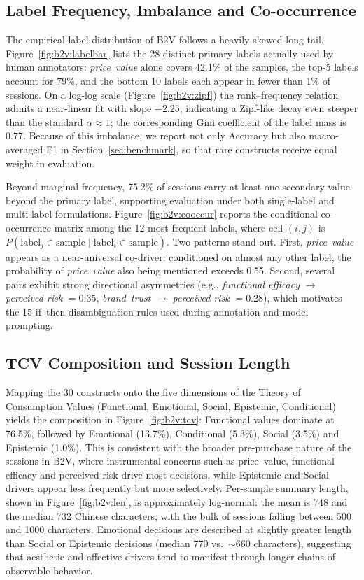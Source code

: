 \documentclass[11pt]{article}
\begin{document}
\subsection{Label Frequency, Imbalance and Co-occurrence}
The empirical label distribution of B2V follows a heavily skewed long tail.
Figure~\ref{fig:b2v:labelbar} lists the 28 distinct primary labels actually
used by human annotators: \emph{price~value} alone covers 42.1\% of the
samples, the top-5 labels account for 79\%, and the bottom 10 labels each
appear in fewer than 1\% of sessions. On a log-log scale
(Figure~\ref{fig:b2v:zipf}) the rank--frequency relation admits a near-linear
fit with slope $-2.25$, indicating a Zipf-like decay even steeper than the
standard $\alpha\!\approx\!1$; the corresponding Gini coefficient of the
label mass is $0.77$. Because of this imbalance, we report not only Accuracy
but also macro-averaged F1 in Section~\ref{sec:benchmark}, so that rare
constructs receive equal weight in evaluation.

Beyond marginal frequency, 75.2\% of sessions carry at least one secondary
value beyond the primary label, supporting evaluation under both single-label
and multi-label formulations. Figure~\ref{fig:b2v:cooccur} reports the
conditional co-occurrence matrix among the 12 most frequent labels, where
cell $(i,j)$ is
$P(\text{label}_j \in \text{sample} \mid \text{label}_i \in \text{sample})$.
Two patterns stand out. First, \emph{price~value} appears as a near-universal
co-driver: conditioned on almost any other label, the probability of
\emph{price~value} also being mentioned exceeds 0.55. Second, several pairs
exhibit strong directional asymmetries (e.g., \emph{functional efficacy}
$\to$ \emph{perceived risk} $=0.35$, \emph{brand~trust}
$\to$ \emph{perceived risk} $=0.28$), which motivates the 15 if--then
disambiguation rules used during annotation and model prompting.

\subsection{TCV Composition and Session Length}
Mapping the 30 constructs onto the five dimensions of the Theory of
Consumption Values (Functional, Emotional, Social, Epistemic, Conditional)
yields the composition in Figure~\ref{fig:b2v:tcv}: Functional values
dominate at 76.5\%, followed by Emotional (13.7\%), Conditional (5.3\%),
Social (3.5\%) and Epistemic (1.0\%). This is consistent with the broader
pre-purchase nature of the sessions in B2V, where instrumental concerns such
as price--value, functional efficacy and perceived risk drive most
decisions, while Epistemic and Social drivers appear less frequently but
more selectively. Per-sample summary length, shown in
Figure~\ref{fig:b2v:len}, is approximately log-normal: the mean is 748 and
the median 732 Chinese characters, with the bulk of sessions falling between
500 and 1000 characters. Emotional decisions are described at slightly
greater length than Social or Epistemic decisions (median 770 vs.\ ${\sim}660$
characters), suggesting that aesthetic and affective drivers tend to
manifest through longer chains of observable behavior.
\end{document}
